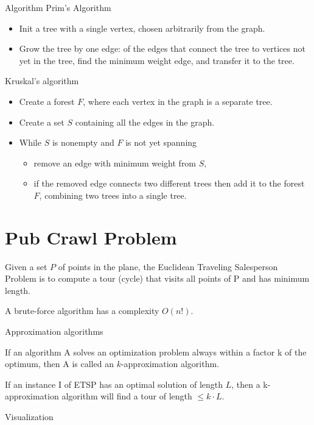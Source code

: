\documentclass[10pt]{beamer}
\begin{document}
\begin{frame}{Algorithm}
	\alert{Prim's Algorithm}
	\begin{itemize}
		\item Init a tree with a single vertex, chosen arbitrarily from the graph.
		\item Grow the tree by one edge: of the edges that connect the tree to vertices 
			  not yet in the tree, find the minimum weight edge, and transfer it to the
			  tree.
	\end{itemize}
	\alert{Kruskal's algorithm}
	\begin{itemize}
		\item Create a forest $F$, where each vertex in the graph is a separate tree.
		\item Create a set $S$ containing all the edges in the graph.
		\item While $S$ is nonempty and $F$ is not yet spanning
			\begin{itemize}
				\item remove an edge with minimum weight from $S$,
				\item if the removed edge connects two different trees then add it to 
				the forest $F$, combining two trees into a single tree.
			\end{itemize}
	\end{itemize}
\end{frame}

\section{Pub Crawl Problem}

\begin{frame}
Given a set $P$ of points in the plane, the \alert{Euclidean Traveling
Salesperson Problem} is to compute a tour (cycle) that visits
all points of P and has minimum length.

A brute-force algorithm has a complexity $O(n!)$.

\end{frame}

\begin{frame}{Approximation algorithms}	

	If an algorithm A solves an optimization problem always
	within a factor k of the optimum, then A is called an
	\alert{$k$-approximation algorithm}.
	\bigskip
	
	If an instance I of ETSP has an optimal solution of length $L$,
	then a k-approximation algorithm will find a tour of length
	$\leq k \cdot L$.

\end{frame}

\begin{frame}{Visualization}
\end{frame}
\end{document}
